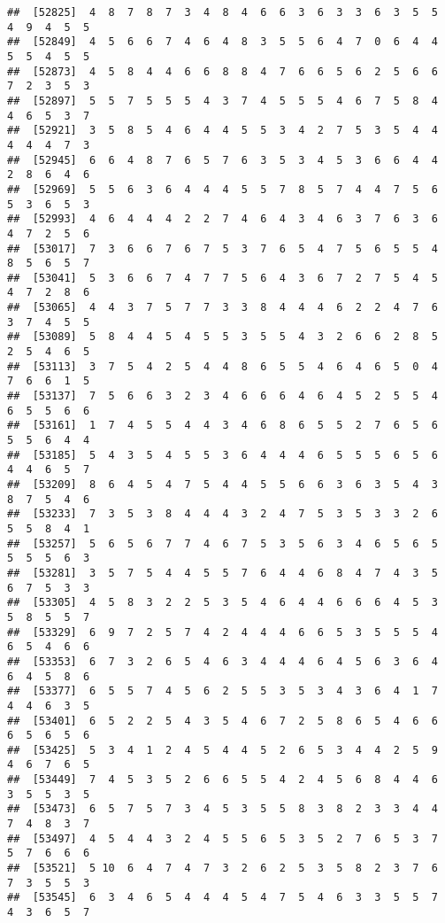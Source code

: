 \documentclass[
]{book}
\begin{document}
\begin{verbatim}
##  [52825]  4  8  7  8  7  3  4  8  4  6  6  3  6  3  3  6  3  5  5  4  9  4  5  5
##  [52849]  4  5  6  6  7  4  6  4  8  3  5  5  6  4  7  0  6  4  4  5  5  4  5  5
##  [52873]  4  5  8  4  4  6  6  8  8  4  7  6  6  5  6  2  5  6  6  7  2  3  5  3
##  [52897]  5  5  7  5  5  5  4  3  7  4  5  5  5  4  6  7  5  8  4  4  6  5  3  7
##  [52921]  3  5  8  5  4  6  4  4  5  5  3  4  2  7  5  3  5  4  4  4  4  4  7  3
##  [52945]  6  6  4  8  7  6  5  7  6  3  5  3  4  5  3  6  6  4  4  2  8  6  4  6
##  [52969]  5  5  6  3  6  4  4  4  5  5  7  8  5  7  4  4  7  5  6  5  3  6  5  3
##  [52993]  4  6  4  4  4  2  2  7  4  6  4  3  4  6  3  7  6  3  6  4  7  2  5  6
##  [53017]  7  3  6  6  7  6  7  5  3  7  6  5  4  7  5  6  5  5  4  8  5  6  5  7
##  [53041]  5  3  6  6  7  4  7  7  5  6  4  3  6  7  2  7  5  4  5  4  7  2  8  6
##  [53065]  4  4  3  7  5  7  7  3  3  8  4  4  4  6  2  2  4  7  6  3  7  4  5  5
##  [53089]  5  8  4  4  5  4  5  5  3  5  5  4  3  2  6  6  2  8  5  2  5  4  6  5
##  [53113]  3  7  5  4  2  5  4  4  8  6  5  5  4  6  4  6  5  0  4  7  6  6  1  5
##  [53137]  7  5  6  6  3  2  3  4  6  6  6  4  6  4  5  2  5  5  4  6  5  5  6  6
##  [53161]  1  7  4  5  5  4  4  3  4  6  8  6  5  5  2  7  6  5  6  5  5  6  4  4
##  [53185]  5  4  3  5  4  5  5  3  6  4  4  4  6  5  5  5  6  5  6  4  4  6  5  7
##  [53209]  8  6  4  5  4  7  5  4  4  5  5  6  6  3  6  3  5  4  3  8  7  5  4  6
##  [53233]  7  3  5  3  8  4  4  4  3  2  4  7  5  3  5  3  3  2  6  5  5  8  4  1
##  [53257]  5  6  5  6  7  7  4  6  7  5  3  5  6  3  4  6  5  6  5  5  5  5  6  3
##  [53281]  3  5  7  5  4  4  5  5  7  6  4  4  6  8  4  7  4  3  5  6  7  5  3  3
##  [53305]  4  5  8  3  2  2  5  3  5  4  6  4  4  6  6  6  4  5  3  5  8  5  5  7
##  [53329]  6  9  7  2  5  7  4  2  4  4  4  6  6  5  3  5  5  5  4  6  5  4  6  6
##  [53353]  6  7  3  2  6  5  4  6  3  4  4  4  6  4  5  6  3  6  4  6  4  5  8  6
##  [53377]  6  5  5  7  4  5  6  2  5  5  3  5  3  4  3  6  4  1  7  4  4  6  3  5
##  [53401]  6  5  2  2  5  4  3  5  4  6  7  2  5  8  6  5  4  6  6  6  5  6  5  6
##  [53425]  5  3  4  1  2  4  5  4  4  5  2  6  5  3  4  4  2  5  9  4  6  7  6  5
##  [53449]  7  4  5  3  5  2  6  6  5  5  4  2  4  5  6  8  4  4  6  3  5  5  3  5
##  [53473]  6  5  7  5  7  3  4  5  3  5  5  8  3  8  2  3  3  4  4  7  4  8  3  7
##  [53497]  4  5  4  4  3  2  4  5  5  6  5  3  5  2  7  6  5  3  7  5  7  6  6  6
##  [53521]  5 10  6  4  7  4  7  3  2  6  2  5  3  5  8  2  3  7  6  7  3  5  5  3
##  [53545]  6  3  4  6  5  4  4  4  5  4  7  5  4  6  3  3  5  5  7  4  3  6  5  7

\end{verbatim}
\end{document}
